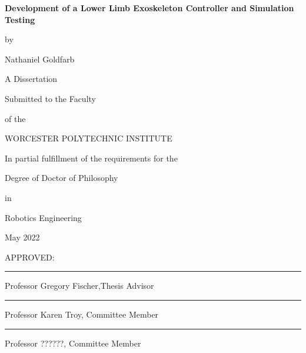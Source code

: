 \documentclass[12pt]{report}
\begin{document}
\newcommand{\brk}{\vspace*{0.18in}}

\thispagestyle{empty}

\begin{center}

\brk


   {\large 
	\textbf{
	Development of a Lower Limb Exoskeleton Controller and Simulation Testing
	}
   }


\brk
by

\brk
Nathaniel Goldfarb


\brk\brk
A Dissertation

\brk
Submitted to the Faculty

\brk
of the 

\brk
WORCESTER POLYTECHNIC INSTITUTE
	
\brk
In partial fulfillment of the requirements for the

\brk
Degree of Doctor of Philosophy

\brk
in

\brk
Robotics Engineering

\brk
May 2022

\end{center}

	
\vfill
APPROVED:

\vspace{0.25in}
\rule{3in}{0.8pt}

Professor Gregory Fischer,Thesis Advisor

\vspace{0.25in}
\rule{3in}{0.8pt}

Professor Karen Troy,  Committee Member


\vspace{0.25in}
\rule{3in}{0.8pt}

Professor ??????,  Committee Member
\end{document}
